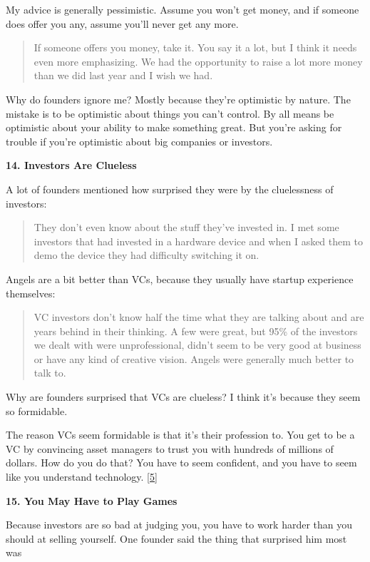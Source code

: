 My advice is generally pessimistic. Assume you won't get money, and if
someone does offer you any, assume you'll never get any more.

\begin{quote}
If someone offers you money, take it. You say it a lot, but I think it
needs even more emphasizing. We had the opportunity to raise a lot more
money than we did last year and I wish we had.
\end{quote}

Why do founders ignore me? Mostly because they're optimistic by nature.
The mistake is to be optimistic about things you can't control. By all
means be optimistic about your ability to make something great. But
you're asking for trouble if you're optimistic about big companies or
investors.

\textbf{14. Investors Are Clueless}

A lot of founders mentioned how surprised they were by the cluelessness
of investors:

\begin{quote}
They don't even know about the stuff they've invested in. I met some
investors that had invested in a hardware device and when I asked them
to demo the device they had difficulty switching it on.
\end{quote}

Angels are a bit better than VCs, because they usually have startup
experience themselves:

\begin{quote}
VC investors don't know half the time what they are talking about and
are years behind in their thinking. A few were great, but 95\% of the
investors we dealt with were unprofessional, didn't seem to be very good
at business or have any kind of creative vision. Angels were generally
much better to talk to.
\end{quote}

Why are founders surprised that VCs are clueless? I think it's because
they seem so formidable.

The reason VCs seem formidable is that it's their profession to. You get
to be a VC by convincing asset managers to trust you with hundreds of
millions of dollars. How do you do that? You have to seem confident, and
you have to seem like you understand technology. {[}\hyperref[f5n]{5}{]}

\textbf{15. You May Have to Play Games}

Because investors are so bad at judging you, you have to work harder
than you should at selling yourself. One founder said the thing that
surprised him most was

